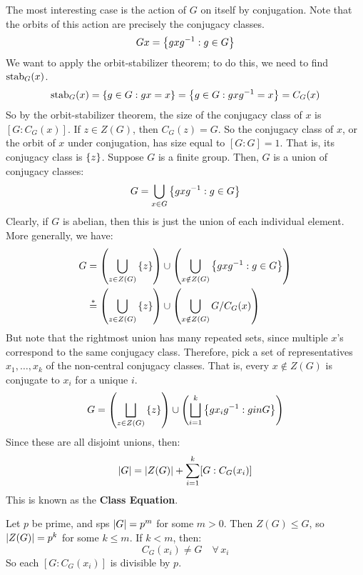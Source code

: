 The most interesting case is the action of $ G $ on itself by conjugation.
Note that the orbits of this action are precisely the conjugacy classes.
\begin{equation*}
    Gx = \left\{{gxg^{-1} : g \in G}\right\}
\end{equation*}
We want to apply the orbit-stabilizer theorem; to do this, we need to find $ \operatorname{stab}_{G}(x) $.
\begin{equation*}
    \operatorname{stab}_{G}(x) = \left\{{g \in G: gx = x}\right\} = \left\{{g \in G : gxg^{-1} = x}\right\} = C_{G}(x)
\end{equation*}
So by the orbit-stabilizer theorem,
the size of the conjugacy class of $ x $ is $ [G:C_{G}(x)] $. \vsp
%
If $ z \in Z(G) $, then $ C_{G}(z) = G $.
So the conjugacy class of $ x $, or the orbit of $ x $ under conjugation,
has size equal to $ [G : G] = 1 $. That is, its conjugacy class is $ \left\{{z}\right\} $. \vsp
%
Suppose $ G $ is a finite group.
Then, $ G $ is a union of conjugacy classes:
\begin{equation*}
    G = \bigcup_{x \in G} \left\{{gxg^{-1} : g \in G}\right\}
\end{equation*}
Clearly, if $ G $ is abelian, then this is just the union of each individual element.
More generally, we have:
\begin{align*}
    G & = \left( \bigcup_{z \in Z(G)} \left\{{z}\right\} \right)
    \cup \left( \bigcup_{x \notin Z(G)} \left\{{gxg^{-1} : g \in G}\right\} \right) \\
      & \stackrel{*}{=} \left( \bigcup_{z \in Z(G)} \left\{{z}\right\} \right)
      \cup \left( \bigcup_{x \notin Z(G)} G/C_{G}(x) \right)
\end{align*}
But note that the rightmost union has many repeated sets, since multiple $ x $'s correspond
to the same conjugacy class.
Therefore, pick a set of representatives $ x_{1}, \dots, x_{k} $ of the non-central conjugacy
classes.
That is, every $ x \notin Z(G) $ is conjugate to $ x_{i} $ for a unique $ i $.
\begin{equation*}
    G = \left( \bigsqcup_{z \in Z(G)} \left\{{z}\right\} \right)
    \cup \left( \bigsqcup_{i=1}^{k} \left\{{gx_{i}g^{-1} : g in G}\right\} \right)
\end{equation*}
Since these are all disjoint unions, then:
\begin{equation*}
    \abs{G} = \abs{Z(G)} + \sum_{i=1}^{k} [G:C_{G}(x_{i})]
\end{equation*}
This is known as the \textbf{Class Equation}.

\begin{xmp}[source=Primary Source Material]
    Let $ p $ be prime, and sps $ \abs{G} = p^{m} $ for some $ m > 0 $.
    Then $ Z(G) \leq G $, so $ \abs{Z(G)} = p^{k} $ for some $ k \leq m $. \vsp
    If $ k < m $, then:
    \begin{equation*}
        C_{G}(x_{i}) \neq G \quad \forall \, x_{i}
    \end{equation*}
    So each $ [G : C_{G}(x_{i})] $ is divisible by $ p $.
\end{xmp}

